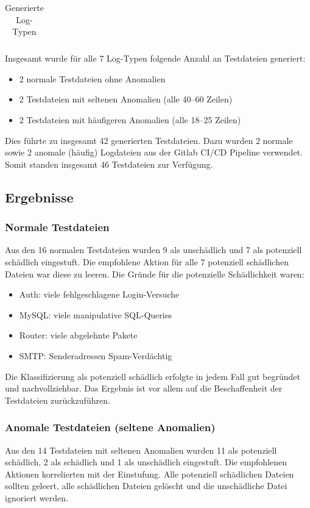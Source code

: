 \documentclass[a4paper,12pt]{report}
\begin{document}
\begin{table}[h!]
\begin{tabular}{|c|p{6cm}|p{6cm}|}
        \end{tabular}
        \caption{Generierte Log-Typen}\label{tab:generated-log-types}
    \end{table}

    \clearpage
    Insgesamt wurde für alle 7 Log-Typen folgende Anzahl an Testdateien generiert:
    \begin{itemize}
        \item 2 normale Testdateien ohne Anomalien
        \item 2 Testdateien mit seltenen Anomalien (alle 40--60 Zeilen)
        \item 2 Testdateien mit häufigeren Anomalien (alle 18--25 Zeilen)
    \end{itemize}
    Dies führte zu insgesamt 42 generierten Testdateien.
    Dazu wurden 2 normale sowie 2 anomale (häufig) Logdateien aus der Gitlab CI/CD Pipeline verwendet.
    Somit standen insgesamt 46 Testdateien zur Verfügung.

    \subsection{Ergebnisse}\label{subsec:ergebnisse}

    \subsubsection{Normale Testdateien}
    Aus den 16 normalen Testdateien wurden 9 als unschädlich und 7 als potenziell schädlich eingestuft.
    Die empfohlene Aktion für alle 7 potenziell schädlichen Dateien war diese zu leeren.
    Die Gründe für die potenzielle Schädlichkeit waren:
    \begin{itemize}
        \item Auth: viele fehlgeschlagene Login-Versuche
        \item MySQL: viele manipulative SQL-Queries
        \item Router: viele abgelehnte Pakete
        \item SMTP: Senderadressen Spam-Verdächtig
    \end{itemize}
    Die Klassifizierung als potenziell schädlich erfolgte in jedem Fall gut begründet und nachvollziehbar.
    Das Ergebnis ist vor allem auf die Beschaffenheit der Testdateien zurückzuführen.

    \subsubsection{Anomale Testdateien (seltene Anomalien)}
    Aus den 14 Testdateien mit seltenen Anomalien wurden 11 als potenziell schädlich, 2 als schädlich und 1 als unschädlich eingestuft.
    Die empfohlenen Aktionen korrelierten mit der Einstufung.
    Alle potenziell schädlichen Dateien sollten geleert, alle schädlichen Dateien gelöscht und die unschädliche Datei ignoriert werden.
\end{document}

